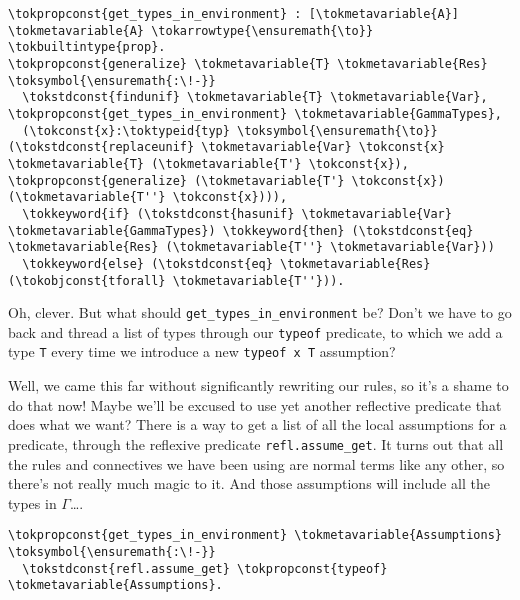 \importantCodeblock{}

\begin{verbatim}
\tokpropconst{get_types_in_environment} : [\tokmetavariable{A}] \tokmetavariable{A} \tokarrowtype{\ensuremath{\to}} \tokbuiltintype{prop}.
\tokpropconst{generalize} \tokmetavariable{T} \tokmetavariable{Res} \toksymbol{\ensuremath{:\!-}}
  \tokstdconst{findunif} \tokmetavariable{T} \tokmetavariable{Var}, \tokpropconst{get_types_in_environment} \tokmetavariable{GammaTypes},
  (\tokconst{x}:\toktypeid{typ} \toksymbol{\ensuremath{\to}} (\tokstdconst{replaceunif} \tokmetavariable{Var} \tokconst{x} \tokmetavariable{T} (\tokmetavariable{T'} \tokconst{x}), \tokpropconst{generalize} (\tokmetavariable{T'} \tokconst{x}) (\tokmetavariable{T''} \tokconst{x}))),
  \tokkeyword{if} (\tokstdconst{hasunif} \tokmetavariable{Var} \tokmetavariable{GammaTypes}) \tokkeyword{then} (\tokstdconst{eq} \tokmetavariable{Res} (\tokmetavariable{T''} \tokmetavariable{Var}))
  \tokkeyword{else} (\tokstdconst{eq} \tokmetavariable{Res} (\tokobjconst{tforall} \tokmetavariable{T''})).
\end{verbatim}

\importantCodeblockEnd{}

\identDialog

\heroSTUDENT{} Oh, clever. But what should
\texttt{get\_types\_in\_environment} be? Don't we have to go back and
thread a list of types through our \texttt{typeof} predicate, to which
we add a type \texttt{T} every time we introduce a new
\texttt{typeof\ x\ T} assumption?

\heroADVISOR{} Well, we came this far without significantly rewriting our
rules, so it's a shame to do that now! Maybe we'll be excused to use yet
another reflective predicate that does what we want? There is a way to
get a list of all the local assumptions for a predicate, through the
reflexive predicate \texttt{refl.assume\_get}. It turns out that all the
rules and connectives we have been using are normal \lamprolog terms
like any other, so there's not really much magic to it. And those
assumptions will include all the types in \(\Gamma\)\ldots{}.

\importantCodeblock{}

\begin{verbatim}
\tokpropconst{get_types_in_environment} \tokmetavariable{Assumptions} \toksymbol{\ensuremath{:\!-}}
  \tokstdconst{refl.assume_get} \tokpropconst{typeof} \tokmetavariable{Assumptions}.
\end{verbatim}

